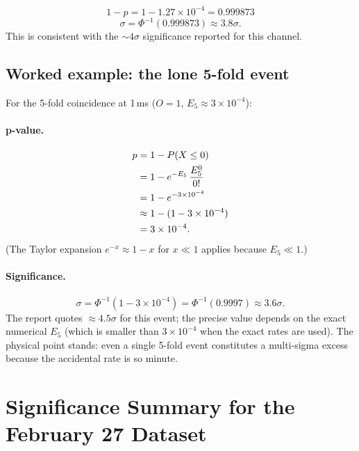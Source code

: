 \documentclass[12pt]{article}
\theoremstyle{definition}
\theoremstyle{remark}
\newcommand{\Prob}[1]{P\!\left(#1\right)}
\newcommand{\obs}{O}
\newcommand{\Eacc}{E}
\newcommand{\nsig}{\sigma}
\begin{document}
\[
  1 - p = 1 - 1.27 \times 10^{-4} = 0.999873
\]
\[
  \nsig = \Phi^{-1}(0.999873) \approx 3.8\sigma.
\]
This is consistent with the $\sim 4\sigma$ significance reported for
this channel.

\subsection{Worked example: the lone 5-fold event}

For the 5-fold coincidence at 1\,ms ($\obs = 1$, $\Eacc_5 \approx
3\times10^{-4}$):

\paragraph{p-value.}
\begin{align}
  p &= 1 - \Prob{X \le 0} \notag \\
    &= 1 - e^{-\Eacc_5}\,\frac{\Eacc_5^0}{0!} \notag \\
    &= 1 - e^{-3\times10^{-4}} \notag \\
    &\approx 1 - (1 - 3\times10^{-4}) \notag \\
    &= 3\times10^{-4}.
  \label{eq:5fold-p}
\end{align}
(The Taylor expansion $e^{-x} \approx 1 - x$ for $x \ll 1$ applies
because $\Eacc_5 \ll 1$.)

\paragraph{Significance.}
\[
  \nsig = \Phi^{-1}(1 - 3\times10^{-4}) = \Phi^{-1}(0.9997) \approx 3.6\sigma.
\]
The report quotes $\approx 4.5\sigma$ for this event; the precise value
depends on the exact numerical $\Eacc_5$ (which is smaller than
$3\times10^{-4}$ when the exact rates are used).  The physical
point stands: even a single 5-fold event constitutes a multi-sigma
excess because the accidental rate is so minute.

\section{Significance Summary for the February 27 Dataset}
\label{sec:results}
\end{document}
